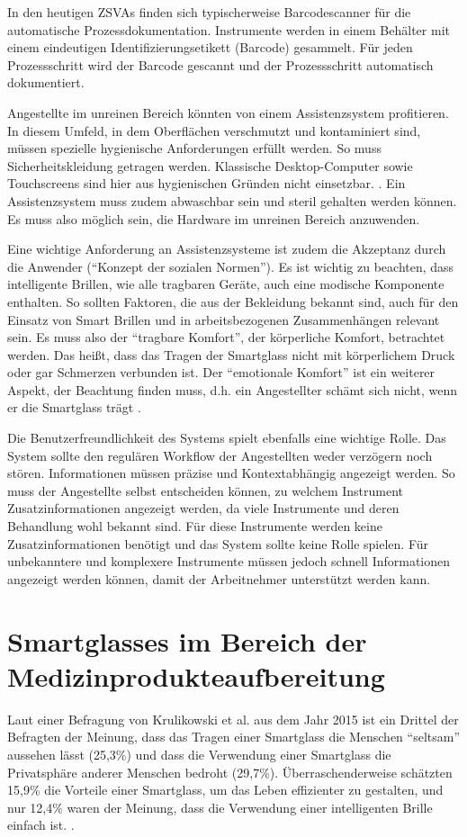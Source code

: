 In den heutigen ZSVAs finden sich typischerweise Barcodescanner für die automatische Prozessdokumentation. Instrumente werden in einem Behälter mit einem eindeutigen Identifizierungsetikett (Barcode) gesammelt. Für jeden Prozessschritt wird der Barcode gescannt und der Prozessschritt automatisch dokumentiert.

Angestellte im unreinen Bereich könnten von einem Assistenzsystem profitieren. 
In diesem Umfeld, in dem Oberflächen verschmutzt und kontaminiert sind, müssen spezielle hygienische Anforderungen erfüllt werden. So muss Sicherheitskleidung getragen werden. Klassische Desktop-Computer sowie Touchscreens sind hier aus hygienischen Gründen nicht einsetzbar.  \cite[S.~28]{Ruther2014}. Ein Assistenzsystem muss zudem abwaschbar sein und steril gehalten werden können. Es muss also möglich sein, die Hardware im unreinen Bereich anzuwenden. 

Eine wichtige Anforderung an Assistenzsysteme ist zudem die Akzeptanz durch die Anwender (\enquote{Konzept der sozialen Normen}). Es ist wichtig zu beachten, dass intelligente Brillen, wie alle tragbaren Geräte, auch eine modische Komponente enthalten. So sollten Faktoren, die aus der Bekleidung bekannt sind, auch für den Einsatz von Smart Brillen und in arbeitsbezogenen Zusammenhängen relevant sein. Es muss also der \enquote{tragbare Komfort}, der körperliche Komfort, betrachtet werden. Das heißt, dass das Tragen der Smartglass nicht mit körperlichem Druck oder gar Schmerzen verbunden ist.  Der \enquote{emotionale Komfort} ist ein weiterer Aspekt, der Beachtung finden muss, d.h. ein Angestellter schämt sich nicht, wenn er die Smartglass trägt \cite{Hein2016}.

Die Benutzerfreundlichkeit des Systems spielt ebenfalls eine wichtige Rolle. Das System sollte den regulären Workflow der Angestellten weder verzögern noch stören. Informationen müssen präzise und Kontextabhängig angezeigt werden. So muss der Angestellte selbst entscheiden können, zu welchem Instrument Zusatzinformationen angezeigt werden, da viele Instrumente und deren Behandlung wohl bekannt sind. Für diese Instrumente werden keine Zusatzinformationen benötigt und das System sollte keine Rolle spielen. Für unbekanntere und komplexere Instrumente müssen jedoch schnell Informationen angezeigt werden können, damit der Arbeitnehmer unterstützt werden kann. \cite[S.~29]{Ruther2014} 
%
%
\section{Smartglasses im Bereich der Medizinprodukteaufbereitung}
\label{sec:Smartglasses_im_Bereich_der_Medizinprodukteaufbereitung}
Laut einer Befragung von Krulikowski et al. aus dem Jahr 2015 \cite{Hein2016} ist ein Drittel der Befragten der Meinung, dass das Tragen einer Smartglass die Menschen \enquote{seltsam} aussehen lässt (25,3\%) und dass die Verwendung einer Smartglass die Privatsphäre anderer Menschen bedroht (29,7\%). Überraschenderweise schätzten 15,9\% die Vorteile einer Smartglass, um das Leben effizienter zu gestalten, und nur 12,4\% waren der Meinung, dass die Verwendung einer intelligenten Brille einfach ist. \cite{Hein2016}. 

